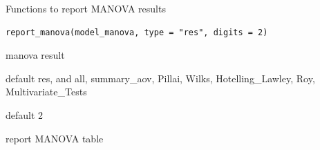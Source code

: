\documentclass[a4paper]{book}
\begin{document}
%
\begin{Description}
Functions to report MANOVA results
\end{Description}
%
\begin{Usage}
\begin{verbatim}
report_manova(model_manova, type = "res", digits = 2)
\end{verbatim}
\end{Usage}
%
\begin{Arguments}
\begin{ldescription}
\item[\code{model\_manova}] manova result

\item[\code{type}] default res, and all, summary\_aov, Pillai, Wilks, Hotelling\_Lawley, Roy, Multivariate\_Tests

\item[\code{digits}] default 2
\end{ldescription}
\end{Arguments}
%
\begin{Value}
report MANOVA table
\end{Value}
%
\end{document}
